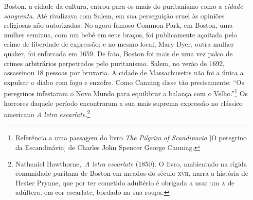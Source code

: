 Boston, a cidade da cultura, entrou para os anais do puritanismo como a
\textit{cidade sangrenta}. Até rivalizava com Salem, em sua perseguição cruel
às opiniões religiosas não autorizadas. No agora famoso Common Park, em
Boston, uma mulher seminua, com um bebê em seus braços, foi publicamente
açoitada pelo crime de liberdade de expressão; e no mesmo local, Mary
Dyer, outra mulher quaker, foi enforcada em 1659. De fato, Boston foi
mais de uma vez palco de crimes arbitrários perpetrados pelo
puritanismo. Salem, no verão de 1692, assassinou 18 pessoas por
bruxaria. A cidade de Massachusetts não foi a única a expulsar o diabo
com fogo e enxofre. Como Canning disse tão precisamente: ``Os peregrinos
infestaram o Novo Mundo para equilibrar a balança com o
Velho.''\footnote{Referência a uma passagem do livro \textit{The Pilgrim
  of Scandinavia} {[}O peregrino da Escandinávia{]} de Charles John
  Spencer George Canning.} Os horrores daquele período encontraram a sua
mais suprema expressão no clássico americano \textit{A letra
escarlate}.\footnote{Nathaniel Hawthorne,~\textit{A letra escarlate}
  (1850). O livro, ambientado na
  rígida comunidade puritana de Boston em meados do século \textsc{xvii}, narra a história de Hester Prynne, que por ter cometido adultério é obrigada a usar um \textsc{a} de adúltera, em cor escarlate, bordado na sua roupa.}

